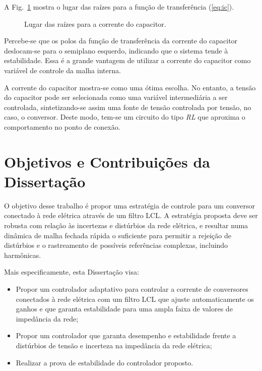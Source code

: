     A Fig.~\ref{fig:rlocus_ic} mostra o lugar das raízes para a função de transferência (\ref{eq:ic}).

    \begin{figure}[htb]
        \centering{
            }
        \renewcommand\figurename{Fig.}
        \caption{Lugar das raízes para a corrente do capacitor.}
        \label{fig:rlocus_ic}
    \end{figure}

    Percebe-se que os polos da função de transferência da corrente do capacitor deslocam-se para o semiplano esquerdo, indicando que o sistema tende à estabilidade. Essa é a grande vantagem de utilizar a corrente do capacitor como variável de controle da malha interna.

    A corrente do capacitor mostra-se como uma ótima escolha. No entanto, a tensão do capacitor pode ser selecionada como uma variável intermediária a ser controlada, sintetizando-se assim uma fonte de tensão controlada por tensão, no caso, o conversor. Deste modo, tem-se um circuito do tipo \emph{RL} que aproxima o comportamento no ponto de conexão.



\section{Objetivos e Contribuições da Dissertação}

	O objetivo desse trabalho é propor uma estratégia de controle para um conversor conectado à rede elétrica através de um filtro LCL. A estratégia proposta deve ser robusta com relação às incertezas e distúrbios da rede elétrica, e resultar numa dinâmica de malha fechada rápida o suficiente para permitir a rejeição de distúrbios e o rastreamento de possíveis referências complexas, incluindo harmônicas.

	Mais especificamente, esta Dissertação visa:

	\begin{itemize}
		\item Propor um controlador adaptativo para controlar a corrente de conversores conectados à rede elétrica com um filtro LCL que ajuste automaticamente os ganhos e que garanta estabilidade para uma ampla faixa de valores de impedância da rede;
		\item Propor um controlador que garanta desempenho e estabilidade frente a distúrbios de tensão e incerteza na impedância da rede elétrica;
		\item Realizar a prova de estabilidade do controlador proposto.
	\end{itemize}


